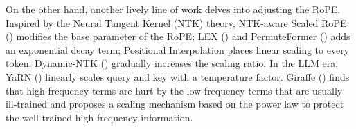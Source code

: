 \noindent On the other hand, another lively line of work delves into adjusting the RoPE. Inspired by the Neural Tangent Kernel (NTK) theory, NTK-aware Scaled RoPE (\cite{xiong2023effective}) modifies the base parameter of the RoPE; LEX (\cite{sun2022lengthextrapolatable}) and  PermuteFormer (\cite{chen2021permuteformer}) adds an exponential decay term; Positional Interpolation places linear scaling to every token; Dynamic-NTK (\cite{huang2019dynamics}) gradually increases the scaling ratio. In the LLM era, YaRN (\cite{peng2023yarn}) linearly scales query and key with a temperature factor. Giraffe (\cite{pal2023giraffe}) finds that high-frequency terms are hurt by the low-frequency terms that are usually ill-trained and proposes a scaling mechanism based on the power law to protect the well-trained high-frequency information. 

